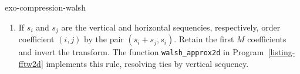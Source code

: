 \begin{correction}{exo-compression-walsh}
\begin{enumerate}
\[\]
Only the retained coefficients need be stored because their positions are
fixed by the ordering. Walsh reconstruction is piecewise constant and can
introduce visible steps. Fourier reconstruction uses smooth trigonometric
functions but can oscillate near discontinuities. The relative error depends
on the signal; neither basis is uniformly better. Finite-bit compression
also quantizes the retained coefficients.
\item If $s_i$ and $s_j$ are the vertical and horizontal sequencies,
respectively, order coefficient $(i,j)$ by the pair $(s_i+s_j,s_i)$.
Retain the first $M$ coefficients and invert the transform.
The function \texttt{walsh\_approx2d} in Program~\ref{listing-fftw2d}
implements this rule, resolving ties by vertical sequency.
\end{enumerate}
\end{correction}

